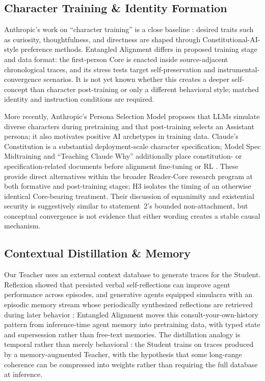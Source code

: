 \subsection{Character Training \& Identity Formation}

Anthropic's work on ``character training'' is a close baseline
\cite{anthropic2024character}: desired traits such as curiosity, thoughtfulness,
and directness are shaped through Constitutional-AI-style preference methods.
Entangled Alignment differs in proposed training stage and data format: the
first-person Core is enacted inside source-adjacent chronological traces, and
its stress tests target self-preservation and instrumental-convergence
scenarios. It is not yet known whether this creates a deeper self-concept than
character post-training or only a different behavioral style; matched identity
and instruction conditions are required.

More recently, Anthropic's Persona Selection Model \cite{marks2026psm} proposes
that LLMs simulate diverse characters during pretraining and that post-training
selects an Assistant persona; it also motivates positive AI archetypes in
training data. Claude's Constitution \cite{askell2026claude} is a substantial
deployment-scale character specification; Model Spec Midtraining and
``Teaching Claude Why'' additionally place constitution- or
specification-related documents before alignment fine-tuning or RL
\cite{li2026modelspec,kutasov2026teachingclaudewhy}. These provide direct
alternatives within the broader Reader-Core research program at both formative
and post-training stages; H3 isolates the timing of an otherwise identical
Core-bearing treatment. Their discussion
of equanimity and existential security is suggestively similar to statement~2's
bounded non-attachment, but conceptual convergence is not evidence that either
wording creates a stable causal mechanism.

\subsection{Contextual Distillation \& Memory}

Our Teacher uses an external context database to generate traces for the
Student. Reflexion \cite{shinn2023reflexion} showed that persisted verbal
self-reflections can improve agent performance across episodes, and generative
agents equipped simulacra with an episodic memory stream whose periodically
synthesized reflections are retrieved during later behavior
\cite{park2023generative}; Entangled Alignment moves this
consult-your-own-history pattern from inference-time agent memory into
pretraining data, with typed state and supersession rather than free-text
memories. The
distillation analogy is temporal rather than merely behavioral
\cite{hinton2015distilling}: the Student trains on traces produced by a
memory-augmented Teacher, with the hypothesis that some long-range coherence
can be compressed into weights rather than requiring the full database at
inference.

